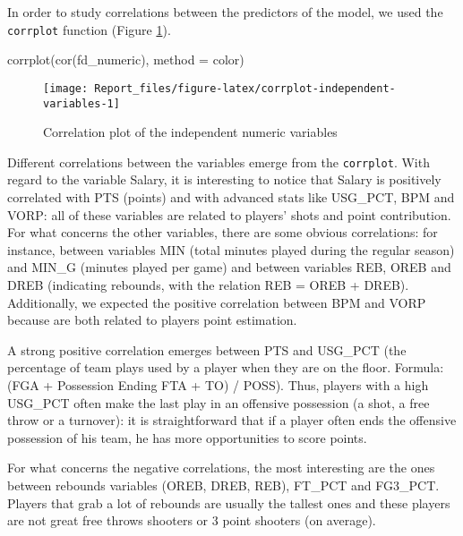 \documentclass[
]{article}
\newenvironment{Shaded}{\begin{snugshade}}{\end{snugshade}}
\newcommand{\AttributeTok}[1]{\textcolor[rgb]{0.77,0.63,0.00}{#1}}
\newcommand{\FunctionTok}[1]{\textcolor[rgb]{0.00,0.00,0.00}{#1}}
\newcommand{\NormalTok}[1]{#1}
\newcommand{\StringTok}[1]{\textcolor[rgb]{0.31,0.60,0.02}{#1}}
\begin{document}
In order to study correlations between the predictors of the model, we
used the \texttt{corrplot} function (Figure
\ref{fig:corrplot-independent-variables}).

\begin{Shaded}
\begin{Highlighting}[]
\FunctionTok{corrplot}\NormalTok{(}\FunctionTok{cor}\NormalTok{(fd\_numeric), }\AttributeTok{method =} \StringTok{\textquotesingle{}color\textquotesingle{}}\NormalTok{)}
\end{Highlighting}
\end{Shaded}

\begin{figure}

{\centering \texttt{[image: Report\_files/figure-latex/corrplot-independent-variables-1]} 

}

\caption{Correlation plot of the independent numeric variables \label{fig:corrplot-independent-variables}}\label{fig:corrplot-independent-variables}
\end{figure}

Different correlations between the variables emerge from the
\texttt{corrplot}. With regard to the variable Salary, it is interesting
to notice that Salary is positively correlated with PTS (points) and
with advanced stats like USG\_PCT, BPM and VORP: all of these variables
are related to players' shots and point contribution. For what concerns
the other variables, there are some obvious correlations: for instance,
between variables MIN (total minutes played during the regular season)
and MIN\_G (minutes played per game) and between variables REB, OREB and
DREB (indicating rebounds, with the relation REB = OREB + DREB).
Additionally, we expected the positive correlation between BPM and VORP
because are both related to players point estimation.

A strong positive correlation emerges between PTS and USG\_PCT (the
percentage of team plays used by a player when they are on the floor.
Formula: (FGA + Possession Ending FTA + TO) / POSS). Thus, players with
a high USG\_PCT often make the last play in an offensive possession (a
shot, a free throw or a turnover): it is straightforward that if a
player often ends the offensive possession of his team, he has more
opportunities to score points.

For what concerns the negative correlations, the most interesting are
the ones between rebounds variables (OREB, DREB, REB), FT\_PCT and
FG3\_PCT. Players that grab a lot of rebounds are usually the tallest
ones and these players are not great free throws shooters or 3 point
shooters (on average).
\end{document}
